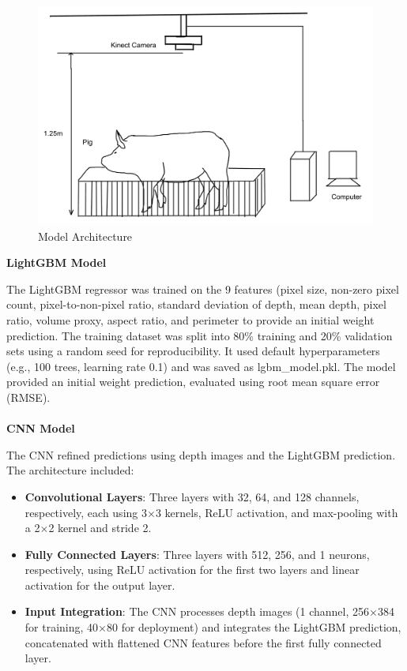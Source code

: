 {\begin{figure}[h]
	\centering
	\includegraphics[height=0.4\textheight]{figures/Untitled-1wqw}
	\caption{Model Architecture}
	\label{fig:Model Architecture}
\end{figure}

\noindent \textbf{LightGBM Model}

The LightGBM regressor was trained on the 9 features (pixel size, non-zero pixel count, pixel-to-non-pixel ratio, standard deviation of depth, mean depth, pixel ratio, volume proxy, aspect ratio, and perimeter to provide an initial weight prediction. The training dataset was split into 80\% training and 20\% validation sets using a random seed for reproducibility. It used default hyperparameters (e.g., 100 trees, learning rate 0.1) and was saved as lgbm\_model.pkl. The model provided an initial weight prediction, evaluated using root mean square error (RMSE).
\\
\\
\noindent \textbf{CNN Model}

The CNN refined predictions using depth images and the LightGBM prediction. The architecture included:
\begin{itemize}
	\item \textbf{Convolutional Layers}: Three layers with 32, 64, and 128 channels, respectively, each using 3$\times$3 kernels, ReLU activation, and max-pooling with a 2$\times$2 kernel and stride 2.
	\item \textbf{Fully Connected Layers}: Three layers with 512, 256, and 1 neurons, respectively, using ReLU activation for the first two layers and linear activation for the output layer.
	\item \textbf{Input Integration}: The CNN processes depth images (1 channel, 256$\times$384 for training, 40$\times$80 for deployment) and integrates the LightGBM prediction, concatenated with flattened CNN features before the first fully connected layer.
\end{itemize}

}
